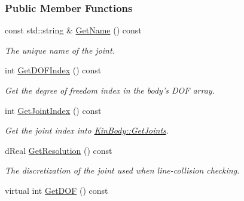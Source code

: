 \subsubsection*{Public Member Functions}
\begin{DoxyCompactItemize}
\item 
\hypertarget{classOpenRAVE_1_1KinBody_1_1Joint_a8b9389d7613c0942dded4c6af39d7ab1}{
const std::string \& \hyperlink{classOpenRAVE_1_1KinBody_1_1Joint_a8b9389d7613c0942dded4c6af39d7ab1}{GetName} () const }
\label{classOpenRAVE_1_1KinBody_1_1Joint_a8b9389d7613c0942dded4c6af39d7ab1}

\begin{DoxyCompactList}\small\item\em The unique name of the joint. \item\end{DoxyCompactList}\item 
int \hyperlink{classOpenRAVE_1_1KinBody_1_1Joint_aa008d1863733a137b9a417d8e5277bb0}{GetDOFIndex} () const 
\begin{DoxyCompactList}\small\item\em Get the degree of freedom index in the body's DOF array. \item\end{DoxyCompactList}\item 
\hypertarget{classOpenRAVE_1_1KinBody_1_1Joint_abacd0a7209e404b812bb3ca71a494d0a}{
int \hyperlink{classOpenRAVE_1_1KinBody_1_1Joint_abacd0a7209e404b812bb3ca71a494d0a}{GetJointIndex} () const }
\label{classOpenRAVE_1_1KinBody_1_1Joint_abacd0a7209e404b812bb3ca71a494d0a}

\begin{DoxyCompactList}\small\item\em Get the joint index into \hyperlink{classOpenRAVE_1_1KinBody_a01fcab06f416b2ac3bac1385e09ff9bf}{KinBody::GetJoints}. \item\end{DoxyCompactList}\item 
dReal \hyperlink{classOpenRAVE_1_1KinBody_1_1Joint_a488fee47ef2f64285df38276b3902879}{GetResolution} () const 
\begin{DoxyCompactList}\small\item\em The discretization of the joint used when line-\/collision checking. \item\end{DoxyCompactList}\item 
\hypertarget{classOpenRAVE_1_1KinBody_1_1Joint_a44fbec2fd26a45cada889c5c0f0751c8}{
virtual int \hyperlink{classOpenRAVE_1_1KinBody_1_1Joint_a44fbec2fd26a45cada889c5c0f0751c8}{GetDOF} () const }
\label{classOpenRAVE_1_1KinBody_1_1Joint_a44fbec2fd26a45cada889c5c0f0751c8}


\end{DoxyCompactItemize}
